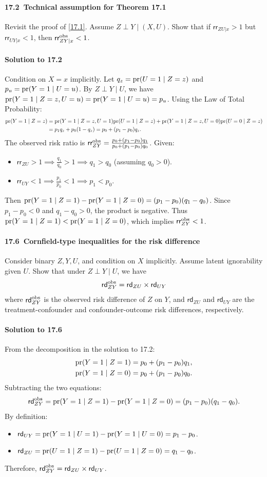 \documentclass[krantz1]{krantz}
\def\pr{\textup{pr}}
\def\ind{\perp}
\def\RD{\textsf{rd}}
\def\RR{\textsf{rr}}
\def\obs{\textup{obs}}
\def\Paragraph{\paragraph}
\begin{document}
 \Paragraph{17.2~Technical assumption for Theorem 17.1}\label{hw::technical-assumption}

Revisit the proof of \cref{17.1}. Assume $Z\ind Y \mid (X, U)$. Show that if $\RR_{ZU|x} > 1$ but $\RR_{UY|x} < 1$, then $\RR_{ZY|x}^{\obs} < 1$.

\Paragraph{Solution to 17.2}

Condition on $X=x$ implicitly. Let $q_z = \pr(U=1 \mid Z=z)$ and $p_u = \pr(Y=1 \mid U=u)$. By $Z \ind Y \mid U$, we have $\pr(Y=1 \mid Z=z, U=u) = \pr(Y=1 \mid U=u) = p_u$.
Using the Law of Total Probability:
\begin{align*}
    \pr(Y=1 \mid Z=z) &= \pr(Y=1 \mid Z=z, U=1)\pr(U=1 \mid Z=z) + \pr(Y=1 \mid Z=z, U=0)\pr(U=0 \mid Z=z) \\
    &= p_1 q_z + p_0 (1 - q_z) = p_0 + (p_1 - p_0)q_z.
\end{align*}
The observed risk ratio is $\RR_{ZY}^{\obs} = \frac{p_0 + (p_1 - p_0)q_1}{p_0 + (p_1 - p_0)q_0}$. 
Given:
\begin{itemize}
    \item $\RR_{ZU} > 1 \implies \frac{q_1}{q_0} > 1 \implies q_1 > q_0$ (assuming $q_0 > 0$).
    \item $\RR_{UY} < 1 \implies \frac{p_1}{p_0} < 1 \implies p_1 < p_0$.
\end{itemize}
Then $\pr(Y=1 \mid Z=1) - \pr(Y=1 \mid Z=0) = (p_1 - p_0)(q_1 - q_0)$.
Since $p_1 - p_0 < 0$ and $q_1 - q_0 > 0$, the product is negative. 
Thus $\pr(Y=1 \mid Z=1) < \pr(Y=1 \mid Z=0)$, which implies $\RR_{ZY}^{\obs} < 1$.

 \Paragraph{17.6~Cornfield-type inequalities for the risk difference}\label{hw::cornfield-rd}

Consider binary $Z, Y, U$, and condition on $X$ implicitly. Assume latent ignorability given $U$. Show that under $Z\ind Y \mid U$, we have
$$
\RD_{ZY}^{\obs} = \RD_{ZU} \times \RD_{UY}
$$
where $\RD_{ZY}^{\obs}$ is the observed risk difference of $Z$ on $Y$, and $\RD_{ZU}$ and $\RD_{UY}$ are the treatment-confounder and confounder-outcome risk differences, respectively.

\Paragraph{Solution to 17.6}

From the decomposition in the solution to 17.2:
\begin{align*}
    \pr(Y=1 \mid Z=1) &= p_0 + (p_1 - p_0)q_1, \\
    \pr(Y=1 \mid Z=0) &= p_0 + (p_1 - p_0)q_0.
\end{align*}
Subtracting the two equations:
\begin{equation*}
    \RD_{ZY}^{\obs} = \pr(Y=1 \mid Z=1) - \pr(Y=1 \mid Z=0) = (p_1 - p_0)(q_1 - q_0).
\end{equation*}
By definition:
\begin{itemize}
    \item $\RD_{UY} = \pr(Y=1 \mid U=1) - \pr(Y=1 \mid U=0) = p_1 - p_0$.
    \item $\RD_{ZU} = \pr(U=1 \mid Z=1) - \pr(U=1 \mid Z=0) = q_1 - q_0$.
\end{itemize}
Therefore, $\RD_{ZY}^{\obs} = \RD_{ZU} \times \RD_{UY}$.
\end{document}
